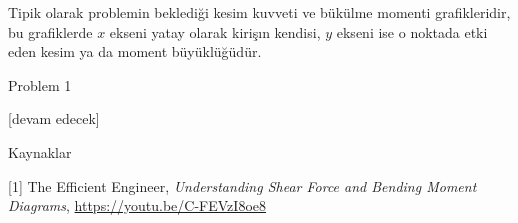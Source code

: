 \documentclass[12pt,fleqn]{article}\usepackage{../../common}
\begin{document}
Tipik olarak problemin beklediği kesim kuvveti ve bükülme momenti grafikleridir,
bu grafiklerde $x$ ekseni yatay olarak kirişın kendisi, $y$ ekseni ise o noktada
etki eden kesim ya da moment büyüklüğüdür. 

Problem 1














[devam edecek]

Kaynaklar 

[1] The Efficient Engineer, {\em Understanding Shear Force and Bending Moment Diagrams},
    \url{https://youtu.be/C-FEVzI8oe8}
\end{document}

